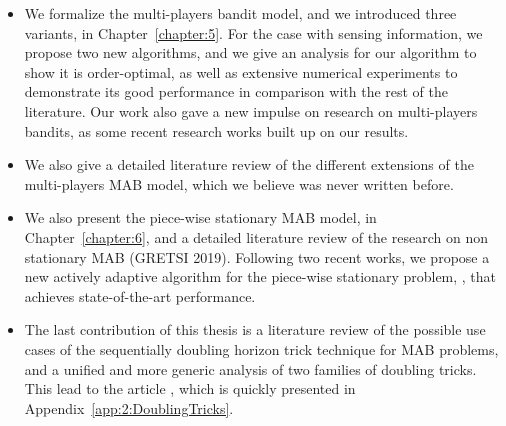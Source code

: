 \begin{itemize}

    \item
    We formalize the multi-players bandit model, and we introduced three variants, in Chapter~\ref{chapter:5}.
    For the case with sensing information, we propose two new algorithms, and we give an analysis for our algorithm \MCTopM{} to show it is order-optimal,
    as well as extensive numerical experiments to demonstrate its good performance in comparison with the rest of the literature.
    Our work \cite{Besson2018ALT} also gave a new impulse on research on multi-players bandits, as some recent research works built up on our results.

    \item
    We also give a detailed literature review of the different extensions of the multi-players MAB model, which we believe was never written before.

    \item
    We also present the piece-wise stationary MAB model, in Chapter~\ref{chapter:6}, and a detailed literature review of the research on non stationary MAB \cite{Besson2019GLRT,Besson2019Gretsi} (GRETSI 2019).
    Following two recent works, we propose a new actively adaptive algorithm for the piece-wise stationary problem, \GLRklUCB, that achieves state-of-the-art performance.

    \item
    The last contribution of this thesis is a literature review of the possible use cases of the sequentially doubling horizon trick technique for MAB problems,
    and a unified and more generic analysis of two families of doubling tricks.
    This lead to the article \cite{Besson2018DoublingTricks}, which is quickly presented in Appendix~\ref{app:2:DoublingTricks}.
\end{itemize}


